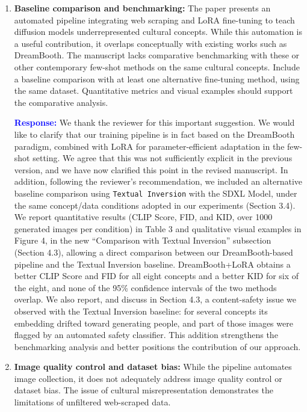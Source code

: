 \documentclass[11pt]{article}
\begin{document}
\begin{enumerate}[label=\textbf{C\arabic*.}, leftmargin=*]
\item \textbf{Baseline comparison and benchmarking:} The paper presents an automated pipeline integrating web scraping and LoRA fine-tuning to teach diffusion models underrepresented cultural concepts. While this automation is a useful contribution, it overlaps conceptually with existing works such as DreamBooth. The manuscript lacks comparative benchmarking with these or other contemporary few-shot methods on the same cultural concepts. Include a baseline comparison with at least one alternative fine-tuning method, using the same dataset. Quantitative metrics and visual examples should support the comparative analysis.

\textbf{\textcolor{blue}{Response:}} We thank the reviewer for this important suggestion. We would like to clarify that our training pipeline is in fact based on the DreamBooth paradigm, combined with LoRA for parameter-efficient adaptation in the few-shot setting. We agree that this was not sufficiently explicit in the previous version, and we have now clarified this point in the revised manuscript. In addition, following the reviewer’s recommendation, we included an alternative baseline comparison using \texttt{Textual Inversion} with the SDXL Model, under the same concept/data conditions adopted in our experiments (Section 3.4). We report quantitative results (CLIP Score, FID, and KID, over 1000 generated images per condition) in Table 3 and qualitative visual examples in Figure 4, in the new ``Comparison with Textual Inversion'' subsection (Section 4.3), allowing a direct comparison between our DreamBooth-based pipeline and the Textual Inversion baseline. DreamBooth+LoRA obtains a better CLIP Score and FID for all eight concepts and a better KID for six of the eight, and none of the 95\% confidence intervals of the two methods overlap. We also report, and discuss in Section 4.3, a content-safety issue we observed with the Textual Inversion baseline: for several concepts its embedding drifted toward generating people, and part of those images were flagged by an automated safety classifier. This addition strengthens the benchmarking analysis and better positions the contribution of our approach.


\item \textbf{Image quality control and dataset bias:} While the pipeline automates image collection, it does not adequately address image quality control or dataset bias. The issue of cultural misrepresentation demonstrates the limitations of unfiltered web-scraped data.


\end{enumerate}
\end{document}
